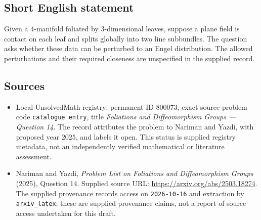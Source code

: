 \documentclass[11pt]{article}
\begin{document}
\subsection{Short English statement}
Given a \(4\)-manifold foliated by \(3\)-dimensional leaves, suppose a plane field is contact on each leaf and splits globally into two line subbundles. The question asks whether these data can be perturbed to an Engel distribution. The allowed perturbations and their required closeness are unspecified in the supplied record.
\subsection{Sources}
\begin{itemize}
\item Local UnsolvedMath registry: permanent ID \(800073\), exact source problem code \texttt{catalogue entry}, title \emph{Foliations and Diffeomorphism Groups --- Question 14}. The record attributes the problem to Nariman and Yazdi, with proposed year \(2025\), and labels it open. This status is supplied registry metadata, not an independently verified mathematical or literature assessment.
\item Nariman and Yazdi, \emph{Problem List on Foliations and Diffeomorphism Groups} (2025), Question 14. Supplied source URL: \url{https://arxiv.org/abs/2503.18274}. The supplied provenance records access on \texttt{2026-10-16} and extraction by \texttt{arxiv\_latex}; these are supplied provenance claims, not a report of source access undertaken for this draft.
\end{itemize}
\end{document}
